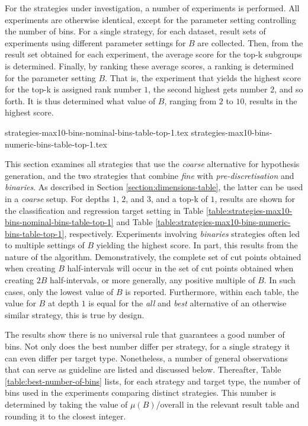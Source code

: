 \documentclass[smallextended]{svjour3}
\newcommand{\parameter}{\emph}
\newcommand{\predis}{\parameter{pre-discretisation}}
\newcommand{\binaries}{\parameter{binaries}}
\newcommand{\fine}{\parameter{fine}}
\newcommand{\coarse}{\parameter{coarse}}
\newcommand{\all}{\parameter{all}}
\newcommand{\best}{\parameter{best}}
\begin{document}
For the strategies under investigation, a number of experiments is performed.
All experiments are otherwise identical, except for the parameter setting controlling the number of bins.
For a single strategy, for each dataset, result sets of experiments using different parameter settings for $B$ are collected.
Then, from the result set obtained for each experiment, the average score for the top-k subgroups is determined.
Finally, by ranking these average scores, a ranking is determined for the parameter setting $B$.
That is, the experiment that yields the highest score for the top-k is assigned rank number $1$, the second highest gets number $2$, and so forth.
It is thus determined what value of $B$, ranging from $2$ to $10$, results in the highest score.

{strategies-max10-bins-nominal-bins-table-top-1.tex}
{strategies-max10-bins-numeric-bins-table-top-1.tex}

This section examines all strategies that use the \coarse{} alternative for hypothesis generation, and the two strategies that combine \fine{} with \predis{} and \binaries{}.
As described in Section \ref{section:dimensions-table}, the latter can be used in a \coarse{} setup.
For depths $1$, $2$, and $3$, and a top-k of $1$, results are shown for the classification and regression target setting in Table \ref{table:strategies-max10-bins-nominal-bins-table-top-1} and Table \ref{table:strategies-max10-bins-numeric-bins-table-top-1}, respectively.
Experiments involving \binaries{} strategies often led to multiple settings of $B$ yielding the highest score.
In part, this results from the nature of the algorithm.
Demonstratively, the complete set of cut points obtained when creating $B$ half-intervals will occur in the set of cut points obtained when creating $2B$ half-intervals, or more generally, any positive multiple of $B$.
In such cases, only the lowest value of $B$ is reported.
Furthermore, within each table, the value for $B$ at depth $1$ is equal for the \all{} and \best{} alternative of an otherwise similar strategy, this is true by design.

The results show there is no universal rule that guarantees a good number of bins.
Not only does the best number differ per strategy, for a single strategy it can even differ per target type.
Nonetheless, a number of general observations that can serve as guideline are listed and discussed below.
Thereafter, Table \ref{table:best-number-of-bins} lists, for each strategy and target type, the number of bins used in the experiments comparing distinct strategies.
This number is determined by taking the value of $\mu(B)$/overall in the relevant result table and rounding it to the closest integer.
\end{document}
